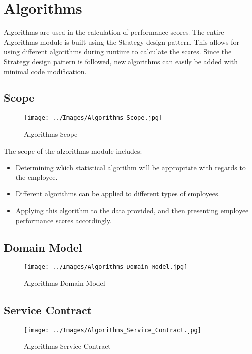 \documentclass[11pt,a4paper]{article}
\begin{document}
\pagebreak

\section{Algorithms}

Algorithms are used in the calculation of performance scores. The entire Algorithms module is built using the Strategy design pattern. This allows for using different algorithms during runtime to calculate the scores. Since the Strategy design pattern is followed, new algorithms can easily be added with minimal code modification.

\subsection{Scope}
\begin{figure}[H]
	\begin{center}
		\texttt{[image: ../Images/Algorithms Scope.jpg]}
		\caption{Algorithms Scope}
	\end{center}
\end{figure}
The scope of the algorithms module includes:
\begin{itemize}
	\item Determining which statistical algorithm will be appropriate with regards to the employee. 
	
	\item Different algorithms can be applied to different types of employees.
	
	\item Applying this algorithm to the data provided, and then presenting employee performance scores accordingly.
\end{itemize}

\subsection{Domain Model}
\begin{figure}[H]
	\begin{center}
		\texttt{[image: ../Images/Algorithms\_Domain\_Model.jpg]}
		\caption{Algorithms Domain Model}
	\end{center}
\end{figure}

\subsection{Service Contract}
\begin{figure}[H]
	\begin{center}
		\texttt{[image: ../Images/Algorithms\_Service\_Contract.jpg]}
		\caption{Algorithms Service Contract}
	\end{center}
\end{figure}
\end{document}
